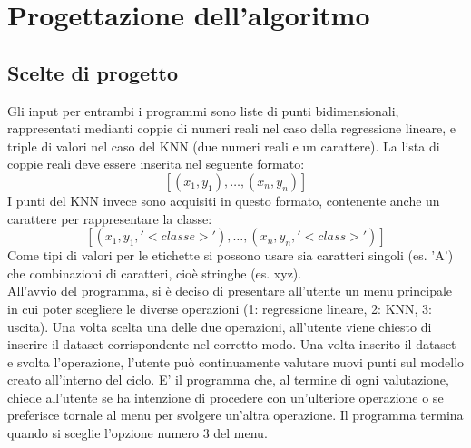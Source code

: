 \documentclass[11pt]{article}
\theoremstyle{definition}
\begin{document}
\newpage

\section{Progettazione dell'algoritmo}

\subsection{Scelte di progetto}
Gli input per entrambi i programmi sono liste di punti bidimensionali, rappresentati medianti coppie di numeri reali nel caso della regressione lineare, e triple di valori nel caso del KNN (due numeri reali e un carattere). La lista di coppie reali deve essere inserita nel seguente formato:
$$
[(x_1, y_1), \dots, (x_n, y_n)]
$$
I punti del KNN invece sono acquisiti in questo formato, contenente anche un carattere per rappresentare la classe:
$$
[(x_1, y_1, '<classe>'), \dots, (x_n, y_n, '<class>')]
$$
Come tipi di valori per le etichette si possono usare sia caratteri singoli (es. 'A') che combinazioni di caratteri, cioè stringhe (es. xyz).\\
\newline
All'avvio del programma, si è deciso di presentare all'utente un menu principale in cui poter scegliere le diverse operazioni (1: regressione lineare, 2: KNN, 3: uscita). Una volta scelta una delle due operazioni, all'utente viene chiesto di inserire il dataset corrispondente nel corretto modo. Una volta inserito il dataset e svolta l'operazione, l'utente può continuamente valutare nuovi punti sul modello creato all'interno del ciclo. E' il programma che, al termine di ogni valutazione, chiede all'utente se ha intenzione di procedere con un'ulteriore operazione o se preferisce tornale al menu per svolgere un'altra operazione. Il programma termina quando si sceglie l'opzione numero 3 del menu.

\newpage
\end{document}

